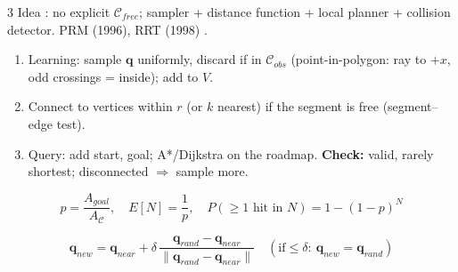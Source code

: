 \begin{multicols}{3}
Idea : no explicit $\mathcal C_{free}$; sampler + distance function + local planner + collision detector. PRM (1996), RRT (1998) .
\begin{recipe}[PRM \pg{70--72}]
\begin{enumerate}
\item Learning: sample $\mathbf q$ uniformly, discard if in $\mathcal C_{obs}$ (point-in-polygon: ray to $+x$, odd crossings = inside); add to $V$.
\item Connect to vertices within $r$ (or $k$ nearest) if the segment is free (segment--edge test).
\item Query: add start, goal; A*/Dijkstra on the roadmap. \textbf{Check:} valid, rarely shortest; disconnected $\Rightarrow$ sample more.
\end{enumerate}
\end{recipe}
\begin{fbx}
\[p=\frac{A_{goal}}{A_{\mathcal C}},\quad E[N]=\frac1p,\quad P(\ge1\text{ hit in }N)=1-(1-p)^N\]
\end{fbx}
\begin{fbx}
\[\mathbf q_{new}=\mathbf q_{near}+\delta\,\frac{\mathbf q_{rand}-\mathbf q_{near}}{\lVert\mathbf q_{rand}-\mathbf q_{near}\rVert}\quad(\text{if}\le\delta:\ \mathbf q_{new}=\mathbf q_{rand})\]

\end{fbx}
\end{multicols}

